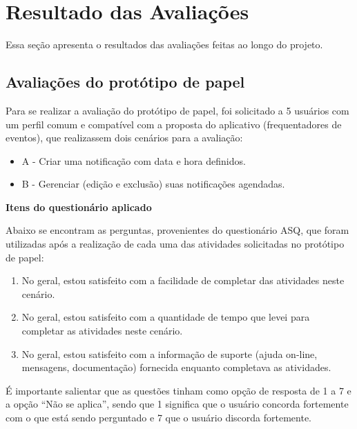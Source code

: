 \chapter{Resultado das Avaliações}
  
  Essa seção apresenta o resultados das avaliações feitas ao longo do projeto.
  
  \section{Avaliações do protótipo de papel}
     
     Para se realizar a avaliação do protótipo de papel, foi solicitado a 5 usuários com um perfil comum
     e compatível com a proposta do aplicativo (frequentadores de eventos), que realizassem dois cenários para a avaliação:
  
    \begin{itemize}
	\item A - Criar uma notificação com data e hora definidos.
	\item B - Gerenciar (edição e exclusão) suas notificações agendadas.
    \end{itemize}
     
    \noindent
    \textbf{Itens do questionário aplicado}
        
        Abaixo se encontram as perguntas, provenientes do questionário ASQ, que foram utilizadas após a realização
        de cada uma das atividades solicitadas no protótipo de papel:
        
	\begin{enumerate}
	\item No geral, estou satisfeito com a facilidade de completar das atividades neste cenário.
	
	\item No geral, estou satisfeito com a quantidade de tempo que levei para completar as atividades neste cenário.
	
	\item No geral, estou satisfeito com a informação de suporte (ajuda on-line, mensagens, documentação) fornecida
	  enquanto completava as atividades.
	\end{enumerate}
     
	É importante salientar que as questões tinham como opção de resposta de 1 a 7 e a opção “Não se aplica”,
	sendo que 1 significa que o usuário concorda fortemente com o que está sendo perguntado e 7 que o usuário
	discorda fortemente.
  
